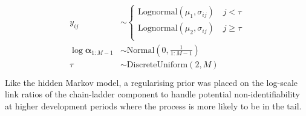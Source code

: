 \begin{align}
\begin{split}
	y_{ij} &\sim 
	\begin{cases}
		\mathrm{Lognormal}(\mu_{1}, \sigma_{ij}) \quad j < \tau\\
		\mathrm{Lognormal}(\mu_{2}, \sigma_{ij}) \quad j \geq \tau\\
	\end{cases}\\
    \log \bm{\alpha}_{1:M - 1} &\sim \mathrm{Normal}(0, \scriptstyle{\frac{1}{1:M-1}})\\
    \tau &\sim \mathrm{DiscreteUniform}(2, M)\\
\end{split}
\end{align}
%
Like the hidden Markov model, a regularising
prior was placed on the log-scale link ratios of the chain-ladder
component to handle potential non-identifiability
at higher development periods where the process
is more likely to be in the tail.
